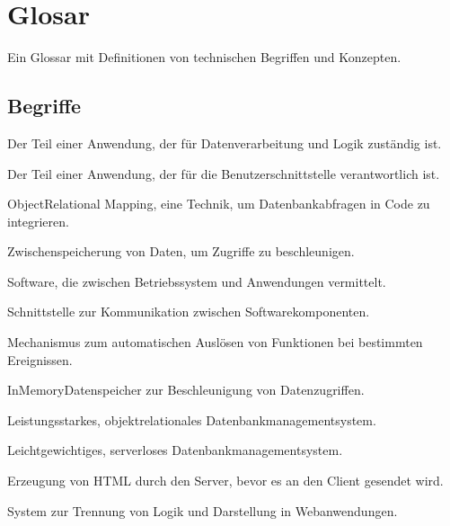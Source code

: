 \documentclass[a4paper,12pt,ngerman]{sphinxmanual}
\begin{document}
\sphinxstepscope


\section{Glosar}
\label{\detokenize{sections/glosar:glosar}}\label{\detokenize{sections/glosar::doc}}
\sphinxAtStartPar
Ein Glossar mit Definitionen von technischen Begriffen und Konzepten.


\subsection{Begriffe}
\label{\detokenize{sections/glosar:begriffe}}
\sphinxAtStartPar
{}
Der Teil einer Anwendung, der für Datenverarbeitung und Logik zuständig ist.

\sphinxAtStartPar
{}
Der Teil einer Anwendung, der für die Benutzerschnittstelle verantwortlich ist.

\sphinxAtStartPar
{}
Object\sphinxhyphen{}Relational Mapping, eine Technik, um Datenbankabfragen in Code zu integrieren.

\sphinxAtStartPar
{}
Zwischenspeicherung von Daten, um Zugriffe zu beschleunigen.

\sphinxAtStartPar
{}
Software, die zwischen Betriebssystem und Anwendungen vermittelt.

\sphinxAtStartPar
{}
Schnittstelle zur Kommunikation zwischen Softwarekomponenten.

\sphinxAtStartPar
{}
Mechanismus zum automatischen Auslösen von Funktionen bei bestimmten Ereignissen.

\sphinxAtStartPar
{}
In\sphinxhyphen{}Memory\sphinxhyphen{}Datenspeicher zur Beschleunigung von Datenzugriffen.

\sphinxAtStartPar
{}
Leistungsstarkes, objektrelationales Datenbankmanagementsystem.

\sphinxAtStartPar
{}
Leichtgewichtiges, serverloses Datenbankmanagementsystem.

\sphinxAtStartPar
{}
Erzeugung von HTML durch den Server, bevor es an den Client gesendet wird.

\sphinxAtStartPar
{}
System zur Trennung von Logik und Darstellung in Webanwendungen.
\end{document}
